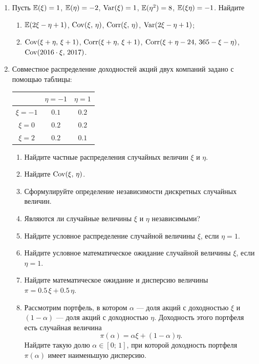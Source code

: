 \begin{enumerate}
\item Пусть $\operatorname{\mathbb{E}}(\xi) = 1$, $\operatorname{\mathbb{E}}(\eta) = -2$, $\operatorname{Var}(\xi) = 1$, $\operatorname{\mathbb{E}}(\eta^2) = 8$, $\operatorname{\mathbb{E}}(\xi \eta) = -1$. Найдите
\begin{enumerate}
\item $\operatorname{\mathbb{E}}(2\xi-\eta+1)$, $\operatorname{Cov}(\xi, \,\eta)$, $\operatorname{Corr}(\xi, \,\eta)$,  $\operatorname{Var}(2\xi-\eta+1)$;
\item $\operatorname{Cov}(\xi+\eta, \,\xi+1)$, $\operatorname{Corr}(\xi+\eta, \,\xi+1)$, $\operatorname{Corr}(\xi+\eta-24, \,365 - \xi - \eta)$, $\operatorname{Cov}(2016\cdot\xi, \, 2017)$.
\end{enumerate}

\item
Совместное распределение доходностей акций двух компаний задано с помощью таблицы:

\begin{center}
\begin{tabular}{ccc}
\toprule
         & $\eta=-1$ & $\eta=1$ \\ \midrule
$\xi=-1$  & $0.1$       & $0.2$ \\
$\xi=0$   & $0.2$       & $0.2$ \\
$\xi=2$   & $0.2$       & $0.1$ \\
\bottomrule
\end{tabular}
\end{center}

\begin{enumerate}
  \item Найдите частные распределения случайных величин $\xi$ и $\eta$.
  \item Найдите $\operatorname{Cov}(\xi,\,\eta)$.
  \item Сформулируйте определение независимости дискретных случайных величин.
  \item Являются ли случайные величины $\xi$ и $\eta$ независимыми?
  \item Найдите условное распределение случайной величины $\xi$, если $\eta = 1$.
  \item Найдите условное математическое ожидание случайной величины $\xi$, если $\eta = 1$.
  \item Найдите математическое ожидание и дисперсию величины $\pi = 0.5\, \xi + 0.5\, \eta$.
  \item Рассмотрим портфель, в котором $\alpha$ — доля акций с доходностью $\xi$
  и $(1 - \alpha)$ — доля акций с доходностью $\eta$. Доходность этого портфеля
  есть случайная величина
  \[
  \pi(\alpha) = \alpha \xi + (1-\alpha)\eta.
  \]
  Найдите такую долю $\alpha \in [0;\,1]$, при которой доходность портфеля $\pi(\alpha)$
  имеет наименьшую дисперсию.
\end{enumerate}


\end{enumerate}
